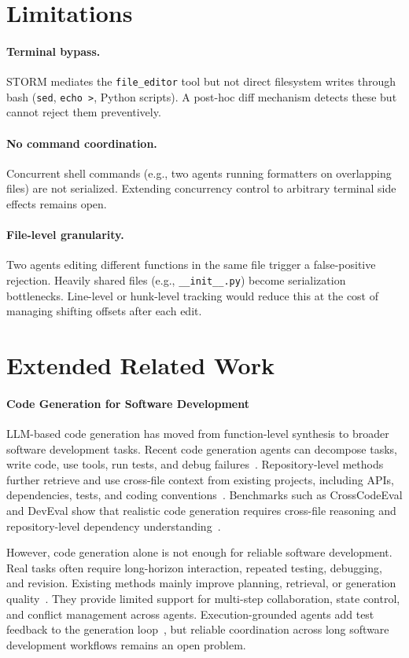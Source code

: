 \documentclass{article}
\begin{document}
\section{Limitations}
\label{sec:limitations}

\paragraph{Terminal bypass.} STORM mediates the \texttt{file\_editor} tool but not direct filesystem writes through bash (\texttt{sed}, \texttt{echo >}, Python scripts). A post-hoc diff mechanism detects these but cannot reject them preventively.

\paragraph{No command coordination.} Concurrent shell commands (e.g., two agents running formatters on overlapping files) are not serialized. Extending concurrency control to arbitrary terminal side effects remains open.

\paragraph{File-level granularity.} Two agents editing different functions in the same file trigger a false-positive rejection. Heavily shared files (e.g., \texttt{\_\_init\_\_.py}) become serialization bottlenecks. Line-level or hunk-level tracking would reduce this at the cost of managing shifting offsets after each edit.

\section{Extended Related Work}
\paragraph{Code Generation for Software Development}
\label{sec:related-code}

LLM-based code generation has moved from function-level synthesis to broader software development tasks. Recent code generation agents can decompose tasks, write code, use tools, run tests, and debug failures~\citep{selfplanning, Rocode, ThinkLonger}. Repository-level methods further retrieve and use cross-file context from existing projects, including APIs, dependencies, tests, and coding conventions~\citep{repocoder,repofusion}. Benchmarks such as CrossCodeEval and DevEval show that realistic code generation requires cross-file reasoning and repository-level dependency understanding~\citep{crosscodeeval,deveval}.

However, code generation alone is not enough for reliable software development. Real tasks often require long-horizon interaction, repeated testing, debugging, and revision. Existing methods mainly improve planning, retrieval, or generation quality~\citep{ThinkAnywhere,li2026mem}. They provide limited support for multi-step collaboration, state control, and conflict management across agents. Execution-grounded agents add test feedback to the generation loop~\citep{agentforge, CodeScore}, but reliable coordination across long software development workflows remains an open problem.
\end{document}
